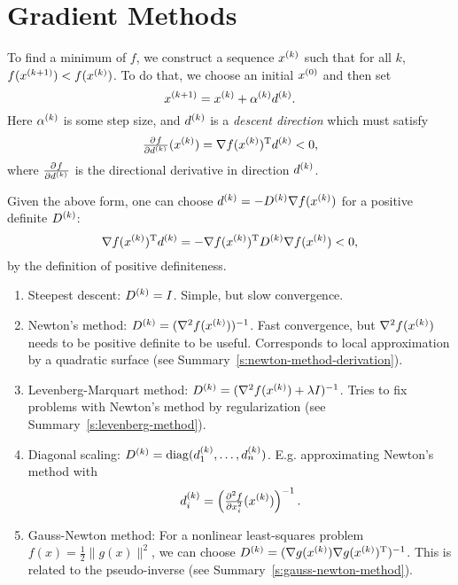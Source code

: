 \documentclass{article}
\begin{document}
\section{Gradient Methods}

\label{s:gradient-methods}

To find a minimum of \(f\), we construct a sequence \(\kth{x}\) such that for all \(k\),
\(f(\kth[k+1]{x}) < f(\kth{x})\).  To do that, we choose an initial \(\kth[0]{x}\) and then set
\begin{equation*}
  \kth[k+1]{x} = \kth{x} + \kth{\alpha} \kth{d}.
\end{equation*}
Here \(\kth{\alpha}\) is some step size, and \(\kth{d}\) is a \emph{descent direction} which must
satisfy
\begin{equation*}
  \pd{f}{{\kth{d}}}(\kth{x}) = \T{\nabla f(\kth{x})} \kth{d} < 0, 
\end{equation*}
where \(\pd{f}{{\kth{d}}}\) is the directional derivative in direction \(\kth{d}\).


\label{s:scaled-gradients}

Given the above form, one can choose \(\kth{d} = -\kth{D} \nabla f(\kth{x})\) for a positive
definite \(\kth{D}\):
\begin{equation*}
  \T{\nabla f(\kth{x})} \kth{d} = -\T{\nabla f(\kth{x})} \kth{D} \nabla f(\kth{x}) < 0,
\end{equation*}
by the definition of positive definiteness.

\begin{enumerate}
\item Steepest descent: \(\kth{D} = I\). Simple, but slow convergence.
\item Newton's method: \(\kth{D} = (\nabla^2 f(\kth{x}))^{-1}\).  Fast convergence, but
  \(\nabla^2 f(\kth{x})\) needs to be positive definite to be useful.  Corresponds to local
  approximation by a quadratic surface (see Summary~\ref{s:newton-method-derivation}).
\item Levenberg-Marquart method: \(\kth{D} = (\nabla^2 f(\kth{x}) + \lambda I)^{-1}\).  Tries
to fix problems with Newton's method by regularization (see Summary~\ref{s:levenberg-method}).
\item Diagonal scaling: \(\kth{D} = \diag(\kth{d}_1, \ldots, \kth{d}_n)\). E.g. approximating
Newton's method with
\begin{equation*}
  \kth{d}_i = \left( \pd[2]{f}{x_i}(\kth{x}) \right)^{-1}.
\end{equation*}
\item Gauss-Newton method: For a nonlinear least-squares problem
\(f(x) = \frac{1}{2} \lVert g(x) \rVert^2\), we can choose
\(\kth{D} = ( \nabla g(\kth{x}) \T{\nabla g(\kth{x})} )^{-1}\).  This is related to the
pseudo-inverse (see Summary~\ref{s:gauss-newton-method}).
\end{enumerate}
\end{document}
